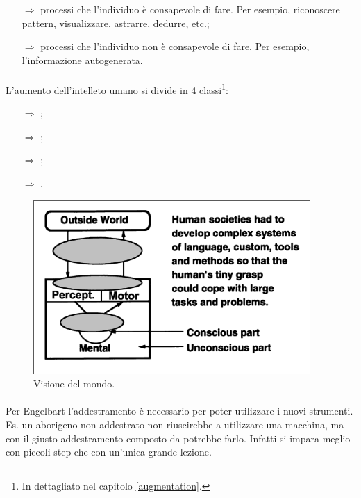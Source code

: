 \begin{itemize}
    \item [$\Rightarrow$]  processi che l'individuo è consapevole di fare. Per 
    esempio, riconoscere pattern, visualizzare, astrarre, dedurre, etc.;
    \item [$\Rightarrow$]  processi che l'individuo non è consapevole di fare. Per esempio,
    l'informazione autogenerata.
\end{itemize}

\paragraph{}

L'aumento dell'intelleto umano si divide in 4 classi\footnote{In dettagliato nel capitolo \ref{augmentation}.}:

\begin{itemize}
    \item [$\Rightarrow$] ;
    \item [$\Rightarrow$] ;
    \item [$\Rightarrow$] ;
    \item [$\Rightarrow$] .
\end{itemize}

\begin{figure}[h]
    \centering
    \includegraphics[scale=0.5]{images/Mondo.png}
    \caption{Visione del mondo.}
    \label{fig:Engelbart}
\end{figure}

\paragraph{}

Per Engelbart l'addestramento è necessario per poter utilizzare i nuovi strumenti. Es. 
un aborigeno non addestrato non riuscirebbe a utilizzare una macchina, ma con il giusto addestramento composto da 
potrebbe farlo. Infatti si impara meglio con piccoli step che con un'unica grande lezione.


